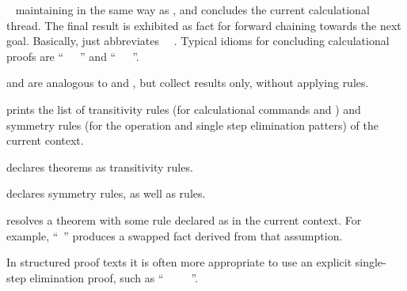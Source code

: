 \begin{isabellebody}
\begin{isamarkuptext}
\begin{descr}
  \item [\mbox{\isa{\isacommand{finally}}}~\isa{{\isacharparenleft}a\isactrlsub {\isadigit{1}}\ {\isasymdots}\ a\isactrlsub n{\isacharparenright}}]
  maintaining \mbox{} in the same way as \mbox{}, and concludes the current calculational thread.  The final
  result is exhibited as fact for forward chaining towards the next
  goal. Basically, \mbox{} just abbreviates \mbox{}~\mbox{}~\mbox{}.  Typical idioms for
  concluding calculational proofs are ``\mbox{}~\mbox{}~~\mbox{\isa{\isacommand{{\isachardot}}}}'' and ``\mbox{}~\mbox{}~\isa{{\isasymphi}}~\mbox{\isa{\isacommand{{\isachardot}}}}''.

  \item [\mbox{\isa{\isacommand{moreover}}} and \mbox{\isa{\isacommand{ultimately}}}] are
  analogous to \mbox{} and \mbox{}, but collect
  results only, without applying rules.

  \item [\mbox{\isa{\isacommand{print{\isacharunderscore}trans{\isacharunderscore}rules}}}] prints the list of
  transitivity rules (for calculational commands \mbox{} and
  \mbox{}) and symmetry rules (for the \mbox{} operation and single step elimination patters) of the
  current context.

  \item [\mbox{\isa{trans}}] declares theorems as transitivity rules.

  \item [\mbox{\isa{sym}}] declares symmetry rules, as well as
  \mbox{} rules.

  \item [\mbox{\isa{symmetric}}] resolves a theorem with some rule
  declared as \mbox{} in the current context.  For example,
  ``\mbox{}~'' produces a
  swapped fact derived from that assumption.

  In structured proof texts it is often more appropriate to use an
  explicit single-step elimination proof, such as ``\mbox{}~~\mbox{}~\mbox{}~~\mbox{\isa{\isacommand{{\isachardot}{\isachardot}}}}''.


\end{descr}
\end{isamarkuptext}
\end{isabellebody}
